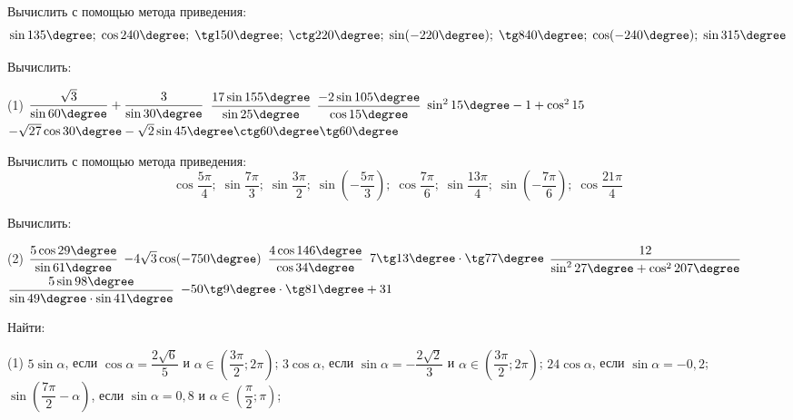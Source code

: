 %
%

\begin{class}[number=1]
	\begin{listofex}
		\item Вычислить с помощью метода приведения:
		\[ \sin135\degree;\;\cos240\degree;\;\tg150\degree;\;\ctg220\degree;\;\sin(-220\degree);\;\tg840\degree;\;\cos(-240\degree);\;\sin315\degree \]
		\item Вычислить:
		\begin{tasks}(1)
			\task \( \dfrac{\sqrt{3}}{\sin60\degree}+\dfrac{3}{\sin30\degree} \)
			\task \( \dfrac{17\sin155\degree}{\sin25\degree} \)
			\task \( \dfrac{-2\sin105\degree}{\cos15\degree} \)
			\task \( \sin^215\degree-1+\cos^215 \)
			\task \( -\sqrt{27}\cos30\degree-\sqrt{2}\sin45\degree\ctg60\degree\tg60\degree\)
		\end{tasks}
		\item Вычислить с помощью метода приведения:
		\[ \cos\dfrac{5\pi}{4};\;\sin\dfrac{7\pi}{3};\;\sin\dfrac{3\pi}{2};\;\sin\left( -\dfrac{5\pi}{3} \right);\;\cos\dfrac{7\pi}{6};\;\sin\dfrac{13\pi}{4};\;\sin\left( -\dfrac{7\pi}{6}  \right);\;\cos\dfrac{21\pi}{4} \]
		\item Вычислить:
		\begin{tasks}(2)
			\task \( \dfrac{5\cos29\degree}{\sin61\degree} \)
			\task \( -4\sqrt{3}\cos(-750\degree) \)
			\task \( \dfrac{4\cos146\degree}{\cos34\degree} \)
			\task \( 7\tg13\degree\cdot\tg77\degree \)
			\task \( \dfrac{12}{\sin^227\degree+\cos^2207\degree} \)
			\task \( \dfrac{5\sin98\degree}{\sin49\degree\cdot\sin41\degree} \)
			\task \( -50\tg9\degree\cdot\tg81\degree+31 \)
		\end{tasks}
		\item Найти:
		\begin{tasks}(1)
			\task \( 5\sin\alpha \), \quad если \( \cos\alpha=\dfrac{2\sqrt{6}}{5} \) и \( \alpha\in\left( \dfrac{3\pi}{2}; 2\pi \right) \);
			\task \( 3\cos\alpha \), \quad если \( \sin\alpha=-\dfrac{2\sqrt{2}}{3} \) и \( \alpha\in\left( \dfrac{3\pi}{2}; 2\pi \right) \);
			\task \( 24\cos\alpha \), \quad если \( \sin\alpha=-0,2 \);
			\task \( \sin\left( \dfrac{7\pi}{2}-\alpha \right) \), \quad если \( \sin\alpha=0,8 \) и \( \alpha\in\left( \dfrac{\pi}{2}; \pi \right) \);
		\end{tasks}
	\end{listofex}
\end{class}


